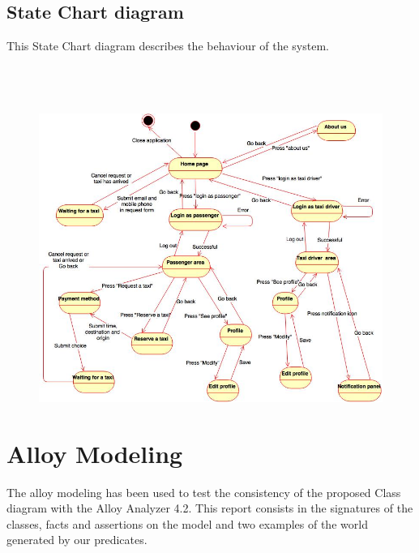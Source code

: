 \documentclass[18pt,oneside,a4paper, titlepage]{article}
\begin{document}
	\subsection{State Chart diagram}
		This State Chart diagram describes the behaviour of the system.
		\\ \\ \\ \\ 
		\begin{figure}[h]
			\centering
			\includegraphics[scale=0.5]{Diagrams/stateChartDiagram.jpg}
		\end{figure}

\newpage
\section{Alloy Modeling}
	The alloy modeling has been used to test the consistency of the proposed Class diagram with the Alloy Analyzer 4.2. This report consists in the signatures of the classes, facts and assertions on the model and two examples of the world generated by our predicates.
\end{document}
